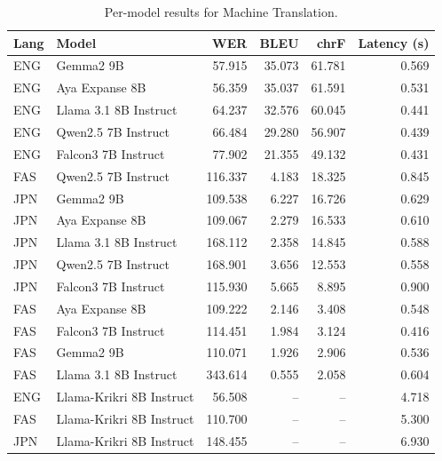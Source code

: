 \begin{table}[t]
\centering
\caption{Per-model results for Machine Translation.}
\label{tab:appendix-machine-translation-analysis}
\begin{tabular}{llrrrr}
\toprule
Lang & Model & WER & BLEU & chrF & Latency (s) \\
\midrule
ENG & Gemma2 9B & 57.915 & 35.073 & 61.781 & 0.569 \\
ENG & Aya Expanse 8B & 56.359 & 35.037 & 61.591 & 0.531 \\
ENG & Llama 3.1 8B Instruct & 64.237 & 32.576 & 60.045 & 0.441 \\
ENG & Qwen2.5 7B Instruct & 66.484 & 29.280 & 56.907 & 0.439 \\
ENG & Falcon3 7B Instruct & 77.902 & 21.355 & 49.132 & 0.431 \\
FAS & Qwen2.5 7B Instruct & 116.337 & 4.183 & 18.325 & 0.845 \\
JPN & Gemma2 9B & 109.538 & 6.227 & 16.726 & 0.629 \\
JPN & Aya Expanse 8B & 109.067 & 2.279 & 16.533 & 0.610 \\
JPN & Llama 3.1 8B Instruct & 168.112 & 2.358 & 14.845 & 0.588 \\
JPN & Qwen2.5 7B Instruct & 168.901 & 3.656 & 12.553 & 0.558 \\
JPN & Falcon3 7B Instruct & 115.930 & 5.665 & 8.895 & 0.900 \\
FAS & Aya Expanse 8B & 109.222 & 2.146 & 3.408 & 0.548 \\
FAS & Falcon3 7B Instruct & 114.451 & 1.984 & 3.124 & 0.416 \\
FAS & Gemma2 9B & 110.071 & 1.926 & 2.906 & 0.536 \\
FAS & Llama 3.1 8B Instruct & 343.614 & 0.555 & 2.058 & 0.604 \\
ENG & Llama-Krikri 8B Instruct & 56.508 & -- & -- & 4.718 \\
FAS & Llama-Krikri 8B Instruct & 110.700 & -- & -- & 5.300 \\
JPN & Llama-Krikri 8B Instruct & 148.455 & -- & -- & 6.930 \\
\bottomrule
\end{tabular}
\end{table}
